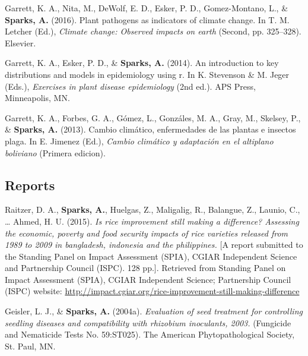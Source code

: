 \documentclass[11pt, a4paper]{awesome-cv}
\begin{document}
\leavevmode\hypertarget{ref-Garrett2016}{}%
Garrett, K. A., Nita, M., DeWolf, E. D., Esker, P. D., Gomez-Montano,
L., \& \textbf{Sparks, A.} (2016). Plant pathogens as indicators of
climate change. In T. M. Letcher (Ed.), \emph{Climate change: Observed
impacts on earth} (Second, pp. 325--328). Elsevier.

\leavevmode\hypertarget{ref-Garrett2014}{}%
Garrett, K. A., Esker, P. D., \& \textbf{Sparks, A.} (2014). An
introduction to key distributions and models in epidemiology using r. In
K. Stevenson \& M. Jeger (Eds.), \emph{Exercises in plant disease
epidemiology} (2nd ed.). APS Press, Minneapolis, MN.

\leavevmode\hypertarget{ref-Garrett2013}{}%
Garrett, K. A., Forbes, G. A., Gómez, L., Gonzáles, M. A., Gray, M.,
Skelsey, P., \& \textbf{Sparks, A.} (2013). Cambio climático,
enfermedades de las plantas e insectos plaga. In E. Jimenez (Ed.),
\emph{Cambio climático y adaptación en el altiplano boliviano} (Primera
edicion).

\endgroup

\hypertarget{reports}{%
\subsection{Reports}\label{reports}}

\begingroup
\setlength{\parindent}{-0.5in}
\setlength{\leftskip}{0.5in}

\hypertarget{refs_reports}{}
\leavevmode\hypertarget{ref-Raitzer2015}{}%
Raitzer, D. A., \textbf{Sparks, A.}, Huelgas, Z., Maligalig, R.,
Balangue, Z., Launio, C., \ldots{} Ahmed, H. U. (2015). \emph{Is rice
improvement still making a difference? Assessing the economic, poverty
and food security impacts of rice varieties released from 1989 to 2009
in bangladesh, indonesia and the philippines.} {[}A report submitted to
the Standing Panel on Impact Assessment (SPIA), CGIAR Independent
Science and Partnership Council (ISPC). 128 pp.{]}. Retrieved from
Standing Panel on Impact Assessment (SPIA), CGIAR Independent Science;
Partnership Council (ISPC) website:
\url{http://impact.cgiar.org/rice-improvement-still-making-difference}

\leavevmode\hypertarget{ref-Geisler2004}{}%
Geisler, L. J., \& \textbf{Sparks, A.} (2004a). \emph{Evaluation of seed
treatment for controlling seedling diseases and compatibility with
rhizobium inoculants, 2003.} (Fungicide and Nematicide Tests No.
59:ST025). The American Phytopathological Society, St. Paul, MN.
\end{document}
